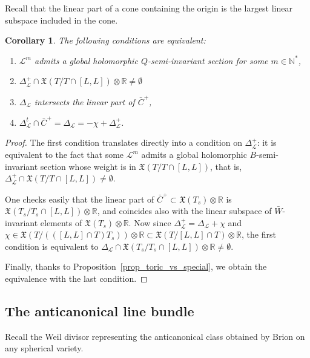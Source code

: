 \documentclass{amsart}
\newtheorem{cor}[thm]{Corollary}
\theoremstyle{definition}
\begin{document}
Recall that the linear part of a cone containing the origin is the largest 
linear subspace included in the cone. 

\begin{cor}
\label{cor_ASSE}
The following conditions are equivalent:
\begin{enumerate}
\item $\mathcal{L}^m$ admits a global holomorphic $Q$-semi-invariant 
section for some $m\in \mathbb{N}^*$, 
\item $\Delta_{\mathcal{L}}^+\cap \mathfrak{X}(T/T\cap [L,L])\otimes \mathbb{R} \neq \emptyset$         
\item $\Delta_{\mathcal{L}}$ intersects the linear part of $\bar{C}^+$,
\item $\Delta_{\mathcal{L}}^t\cap \bar{C}^+=\Delta_{\mathcal{L}}=-\chi+\Delta_{\mathcal{L}}^+$. 
\end{enumerate}
\end{cor}

\begin{proof}
The first condition translates directly into a condition on $\Delta_{\mathcal{L}}^+$:
it is equivalent to the fact that  some $\mathcal{L}^m$ admits a global holomorphic 
$B$-semi-invariant section whose weight is in $\mathfrak{X}(T/T\cap [L,L])$,
that is, $\Delta_{\mathcal{L}}^+\cap \mathfrak{X}(T/T\cap [L,L]) \neq \emptyset$.

One checks easily that the linear part of $\bar{C}^+\subset \mathfrak{X}(T_s)\otimes \mathbb{R}$ 
is $\mathfrak{X}(T_s/T_s\cap [L,L])\otimes \mathbb{R}$, 
and coincides also with the linear subspace of $\bar{W}$-invariant elements of  
$\mathfrak{X}(T_s)\otimes \mathbb{R}$. 
Now since $\Delta_{\mathcal{L}}^+=\Delta_{\mathcal{L}}+\chi$ and 
$\chi\in \mathfrak{X}(T/(([L,L]\cap T)T_s))\otimes \mathbb{R}
\subset \mathfrak{X}(T/[L,L]\cap T)\otimes \mathbb{R}$, 
the first condition is equivalent to 
$\Delta_{\mathcal{L}}\cap \mathfrak{X}(T_s/T_s\cap [L,L])\otimes \mathbb{R}\neq \emptyset$.

Finally, thanks to Proposition~\ref{prop_toric_vs_special}, 
we obtain the equivalence with the last condition.
\end{proof}


\subsection{The anticanonical line bundle}

\label{subsec_ac}

Recall the Weil divisor representing the anticanonical class obtained by Brion 
on any spherical variety.
\end{document}
